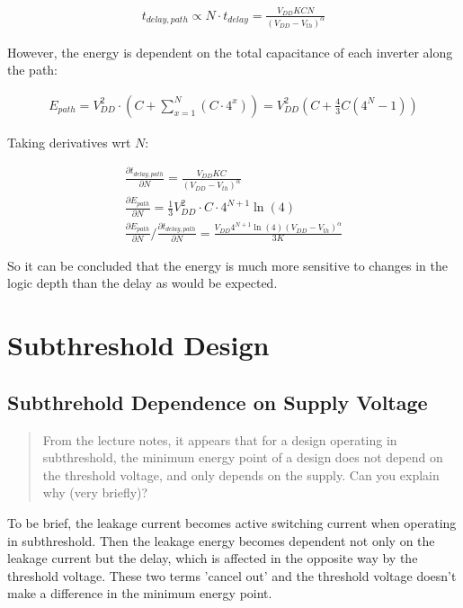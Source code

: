 \documentclass[11pt]{article}
\begin{document}
\begin{align}
	t_{delay,path} \propto N \cdot t_{delay} = \frac{V_{DD} K C N}{(V_{DD} - V_{th})^\alpha} \nonumber 
\end{align}

However, the energy is dependent on the total capacitance of each inverter along the path:

\begin{align}
	E_{path} = V_{DD}^2 \cdot (C + \sum_{x = 1}^{N}(C \cdot 4^x)) = V_{DD}^2 (C + \frac{4}{3} C (4^N - 1)) \nonumber
\end{align}

Taking derivatives wrt $N$:

\begin{align*}
	\frac{\partial t_{delay,path}}{\partial N} = \frac{V_{DD} K C}{(V_{DD} - V_{th})^\alpha} \\
	\frac{\partial E_{path}}{\partial N} = \frac{1}{3} V_{DD}^2 \cdot C \cdot 4^{N+1} \ln(4) \\
	\frac{\partial E_{path}}{\partial N} \bigg/ \frac{\partial t_{delay,path}}{\partial N} = \frac{V_{DD} 4^{N+1} \ln(4) (V_{DD} - V_{th})^\alpha}{3K}
\end{align*}

So it can be concluded that the energy is much more sensitive to changes in the logic depth than the delay as would be expected.

\section{Subthreshold Design}
\subsection{Subthrehold Dependence on Supply Voltage}
\begin{quote}
	From the lecture notes, it appears that for a design operating in subthreshold, the minimum energy point of a design does not depend on the threshold voltage, and only depends on the supply. Can you explain why (very briefly)?
\end{quote}

To be brief, the leakage current becomes active switching current when operating in subthreshold. Then the leakage energy becomes dependent not only on the leakage current but the delay, which is affected in the opposite way by the threshold voltage. These two terms 'cancel out' and the threshold voltage doesn't make a difference in the minimum energy point.
\end{document}
